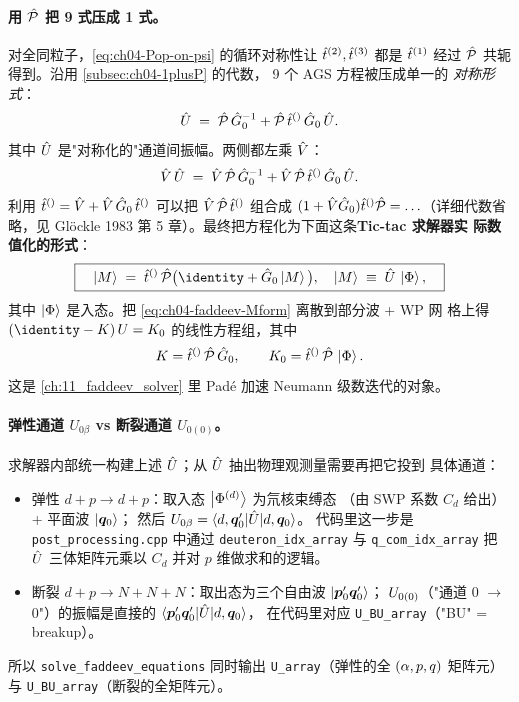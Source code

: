 \paragraph{用 \(\hat{\mathcal{P}}\) 把 9 式压成 1 式。}
对全同粒子，\cref{eq:ch04-Pop-on-psi} 的循环对称性让 \(\hat{t}^{(2)}, \hat{t}^{(3)}\) 都是
\(\hat{t}^{(1)}\) 经过 \(\hat{\mathcal{P}}\) 共轭得到。沿用 \cref{subsec:ch04-1plusP} 的代数，
9 个 AGS 方程被压成单一的 \emph{对称形式}：
\begin{equation}
\label{eq:ch04-AGS-symm}
\hat{U} \;=\; \hat{\mathcal{P}}\,\hat{G}_0^{-1} + \hat{\mathcal{P}}\,\hat{t}^{()}\,\hat{G}_0\,\hat{U}.
\end{equation}
其中 \(\hat{U}\) 是"对称化的"通道间振幅。两侧都左乘 \(\hat{V}\)：
\begin{equation}
\label{eq:ch04-AGS-V-form}
\hat{V}\,\hat{U} \;=\; \hat{V}\,\hat{\mathcal{P}}\,\hat{G}_0^{-1} + \hat{V}\,\hat{\mathcal{P}}\,\hat{t}^{()}\,\hat{G}_0\,\hat{U}.
\end{equation}
利用 \(\hat{t}^{()} = \hat{V} + \hat{V}\,\hat{G}_0\,\hat{t}^{()}\) 可以把 \(\hat{V}\,\hat{\mathcal{P}}\,\hat{t}^{()}\)
组合成 \((1 + \hat{V} \hat{G}_0) \hat{t}^{()} \hat{\mathcal{P}} = \ldots\)（详细代数省略，见
Glöckle 1983 第 5 章）。最终把方程化为下面这条\textbf{Tic-tac 求解器实
际数值化的形式}：
\begin{equation}
\label{eq:ch04-faddeev-Mform}
\boxed{
\quad
\ket{M} \;=\; \Tsub{}\,\Pop \big( \identity + \Gzero \ket{M} \big),
\quad
\ket{M} \;\equiv\; \Uop\,\ket{\Phi},
\quad
}
\end{equation}
其中 \(\ket{\Phi}\) 是入态。把 \cref{eq:ch04-faddeev-Mform} 离散到部分波 + WP 网
格上得 \((\identity - K)\,U = K_0\) 的线性方程组，其中
\begin{equation}
\label{eq:ch04-K-kernel}
K = \hat{t}^{()}\,\hat{\mathcal{P}}\,\hat{G}_0,
\qquad
K_0 = \hat{t}^{()}\,\hat{\mathcal{P}}\,\ket{\Phi}.
\end{equation}
这是 \cref{ch:11_faddeev_solver} 里 Padé 加速 Neumann 级数迭代的对象。

\paragraph{弹性通道 \(U_{0\beta}\) vs 断裂通道 \(U_{0(0)}\)。}
求解器内部统一构建上述 \(\hat{U}\)；从 \(\hat{U}\) 抽出物理观测量需要再把它投到
具体通道：
\begin{itemize}
  \item 弹性 \(d + p \to d + p\)：取入态 \(\ket{\Phi^{(d)}}\) 为氘核束缚态
        （由 SWP 系数 \(C_d\) 给出）+ 平面波 \(\ket{\bm{q}_0}\)；
        然后 \(U_{0\beta} = \langle d, \bm{q}_0' | \hat{U} | d, \bm{q}_0 \rangle\)。
        代码里这一步是 \texttt{post\_processing.cpp} 中通过
        \texttt{deuteron\_idx\_array} 与 \texttt{q\_com\_idx\_array}
        把 \(\hat{U}\) 三体矩阵元乘以 \(C_d\) 并对 \(p\) 维做求和的逻辑。
  \item 断裂 \(d + p \to N + N + N\)：取出态为三个自由波 \(\ket{\bm{p}_0' \bm{q}_0'}\)；
        \(U_{0(0)}\)（"通道 0 \(\to\) 0"）的振幅是直接的
        \(\langle \bm{p}_0' \bm{q}_0' | \hat{U} | d, \bm{q}_0 \rangle\)，
        在代码里对应 \texttt{U\_BU\_array}（"BU" = breakup）。
\end{itemize}
所以 \texttt{solve\_faddeev\_equations} 同时输出 \texttt{U\_array}（弹性的全 \((\alpha, p, q)\)
矩阵元）与 \texttt{U\_BU\_array}（断裂的全矩阵元）。

